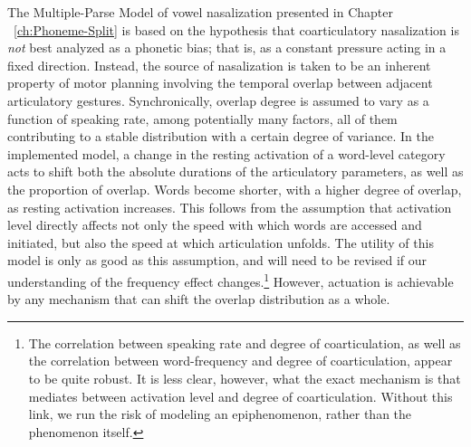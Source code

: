The Multiple-Parse Model of vowel nasalization presented in Chapter ~\ref{ch:Phoneme-Split} is based on the hypothesis that coarticulatory nasalization
is \emph{not} best analyzed as a phonetic bias; that is, as a constant
pressure acting in a fixed direction. Instead, the source of nasalization
is taken to be an inherent property of motor planning involving the
temporal overlap between adjacent articulatory gestures. Synchronically,
overlap degree is assumed to vary as a function of speaking rate,
among potentially many factors, all of them contributing to a stable
distribution with a certain degree of variance. In the implemented
model, a change in the resting activation of a word-level category
acts to shift both the absolute durations of the articulatory parameters,
as well as the proportion of overlap. Words become shorter, with a
higher degree of overlap, as resting activation increases. This follows
from the assumption that activation level directly affects not only
the speed with which words are accessed and initiated, but also the
speed at which articulation unfolds. The utility of this model is
only as good as this assumption, and will need to be revised if our
understanding of the frequency effect changes.\footnote{The correlation between speaking rate and degree of coarticulation,
as well as the correlation between word-frequency and degree of coarticulation,
appear to be quite robust. It is less clear, however, what the exact
mechanism is that mediates between activation level and degree of
coarticulation. Without this link, we run the risk of modeling an
epiphenomenon, rather than the phenomenon itself.} However, actuation is achievable by any mechanism that can shift
the overlap distribution as a whole.

